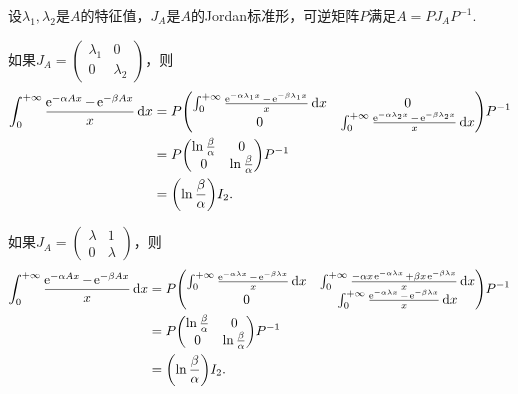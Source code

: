 \begin{solution}
  设$\lambda_1,\lambda_2$是$A$的特征值，$J_A$是$A$的Jordan标准形，可逆矩阵$P$满足$A=PJ_AP^{-1}$.

  如果$J_A=\begin{pmatrix}
    \lambda_1 & 0 \\
    0 & \lambda_2
  \end{pmatrix}$，则
  \begin{align*}
    \int_0^{+\infty} \frac{\ee^{-\alpha Ax} - \ee^{-\beta Ax}}x \dif x & = P
    \begin{pmatrix}
      \int_0^{+\infty} \frac{\ee^{-\alpha \lambda_1 x} - \ee^{-\beta\lambda_1 x}}x \dif x & 0 \\
      0 & \int_0^{+\infty} \frac{\ee^{-\alpha \lambda_2 x} - \ee^{-\beta \lambda_2 x}}x \dif x
    \end{pmatrix} P^{-1} \\
    & = P\begin{pmatrix}
      \ln\frac\beta\alpha & 0 \\
      0 & \ln\frac\beta\alpha
    \end{pmatrix}P^{-1} \\
    & = \left( \ln\frac\beta\alpha\right)I_2.
  \end{align*}

  如果$J_A=\begin{pmatrix}
    \lambda & 1 \\
    0 & \lambda
  \end{pmatrix}$，则
  \begin{align*}
    \int_0^{+\infty} \frac{\ee^{-\alpha Ax} - \ee^{-\beta Ax}}x \dif x & = P
    \begin{pmatrix}
      \int_0^{+\infty} \frac{\ee^{-\alpha \lambda x} - \ee^{-\beta\lambda x}}x \dif x & \int_0^{+\infty} \frac{-\alpha x\ee^{-\alpha \lambda x} +\beta x \ee^{-\beta \lambda x}}x \dif x \\
      0 & \int_0^{+\infty} \frac{\ee^{-\alpha \lambda x} - \ee^{-\beta \lambda x}}x \dif x
    \end{pmatrix} P^{-1} \\
    & = P\begin{pmatrix}
      \ln\frac\beta\alpha & 0 \\
      0 & \ln\frac\beta\alpha
    \end{pmatrix}P^{-1} \\
    & = \left( \ln\frac\beta\alpha\right)I_2.
  \end{align*}
\end{solution}

